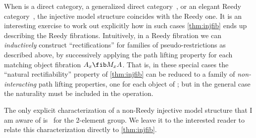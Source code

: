 \begin{concise}
\begin{rmk}\label{rmk:reedy}
  When \D is a direct category, a generalized direct category~\cite{bm:extn-reedy}, or an elegant Reedy category~\cite{br:reedy}, the injective model structure coincides with the Reedy one.
  It is an interesting exercise to work out explicitly how in such cases \cref{thm:injfib} ends up describing the Reedy fibrations.
  Intuitively, in a Reedy fibration we can \emph{inductively} construct ``rectifications'' for families of pseudo-restrictions as described above, by successively applying the path lifting property for each matching object fibration $A_x \fib M_x A$.
  That is, in these special cases the ``natural rectifiability'' property of \cref{thm:injfib} can be reduced to a family of \emph{non-interacting} path lifting properties, one for each object of \D; but in the general case the naturality must be included in the operation.

  The only explicit characterization of a non-Reedy injective model structure that I am aware of is~\cite{bordg:thesis,bordg:injective} for \D the 2-element group.
  We leave it to the interested reader to relate this characterization directly to \cref{thm:injfib}.
\end{rmk}
\end{concise}

